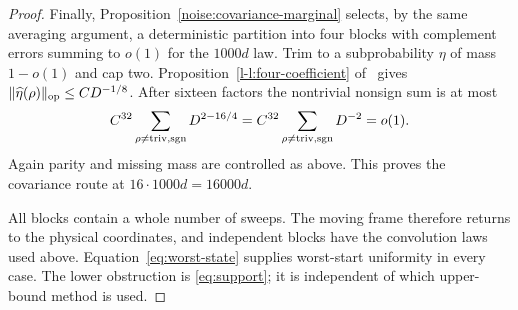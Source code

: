 \begin{proof}
Finally, Proposition~\ref{noise:covariance-marginal} selects,
by the same averaging argument, a deterministic partition into
four blocks with complement errors summing to $o(1)$ for the
$1000d$ law. Trim to a subprobability $\eta$ of mass $1-o(1)$
and cap two. Proposition~\ref*{l-l:four-coefficient} of~\cite{partialFourier} gives
$\|\widehat\eta(\rho)\|_{\mathrm{op}}\le C D^{-1/8}$.
After sixteen factors the nontrivial nonsign sum is at most
\[
 C^{32}\sum_{\rho\ne\mathrm{triv},\operatorname{sgn}}D^{2-16/4}
 =C^{32}\sum_{\rho\ne\mathrm{triv},\operatorname{sgn}}D^{-2}=o(1).
\]
Again parity and missing mass are controlled as above. This
proves the covariance route at $16\cdot1000d=16000d$.


All blocks contain a whole number of sweeps. The moving frame therefore
returns to the physical coordinates, and independent blocks have the
convolution laws used above. Equation~\eqref{eq:worst-state} supplies
worst-start uniformity in every case. The lower obstruction is
\eqref{eq:support}; it is independent of which upper-bound method is used.
\end{proof}
